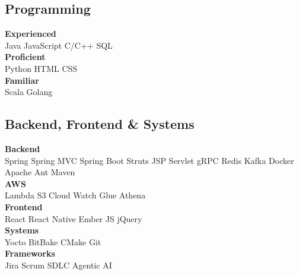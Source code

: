 \documentclass[11pt]{plushcv}
\begin{document}
\begin{minipage}[t]{0.45\textwidth}
\subsection{Programming}
\fontsize{11pt}{13pt}\selectfont %
\textbf{Experienced}\\ Java \textbullet{} JavaScript \textbullet{} C/C++ \textbullet{} SQL \\ \textbf{Proficient}\\ Python \textbullet{} HTML \textbullet{} CSS \\
\textbf{Familiar}\\ Scala \textbullet{} Golang
\end{minipage}
\hfill
\begin{minipage}[t]{0.52\textwidth}
\subsection{Backend, Frontend \& Systems}
\fontsize{11pt}{13pt}\selectfont %
\textbf{Backend}\\ Spring \textbullet{} Spring MVC \textbullet{} Spring Boot \textbullet{} Struts \textbullet{} JSP \textbullet{} Servlet \textbullet{} gRPC  \textbullet{} Redis \textbullet{} Kafka \textbullet{} Docker \textbullet{} Apache Ant \textbullet{} Maven \\
\textbf{AWS}\\ Lambda \textbullet{} S3 \textbullet{} Cloud Watch \textbullet{} Glue \textbullet{} Athena \\
\textbf{Frontend}\\ React \textbullet{} React Native \textbullet{} Ember JS \textbullet{} jQuery \\
\textbf{Systems}\\ Yocto \textbullet{} BitBake \textbullet{} CMake \textbullet{} Git \\
\textbf{Frameworks}\\ Jira \textbullet{} Scrum \textbullet{} SDLC \textbullet{} Agentic AI
\end{minipage}

\vspace{25pt} %

\end{document}
